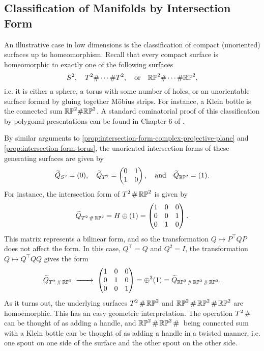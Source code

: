 \subsection{Classification of Manifolds by Intersection Form}
An illustrative case in low dimensions is the classification of compact (unoriented) surfaces up to homeomorphism. Recall that every compact surface is homeomorphic to exactly one of the following surfaces
\[
	S^2,\quad T^2\#\cdots\# T^2,\quad\textrm{or}\quad \mathbb{RP}^2\#\cdots\# \mathbb{RP}^2,
\]
i.e. it is either a sphere, a torus with some number of holes, or an unorientable surface formed by gluing together M\"obius strips. For instance, a Klein bottle is the connected sum $\mathbb{RP}^2\#\mathbb{RP}^2$. 
A standard cominatorial proof of this classification by polygonal presentations can be found in Chapter 6 of \cite{lee2011topological}.

By similar arguments to \cref{prop:intersection-form-complex-projective-plane} and \cref{prop:intersection-form-torus}, the unoriented intersection forms of these generating surfaces are given by
\[
	\widetilde{Q}_{S^2}=(0),\quad \widetilde{Q}_{T^2}=\begin{pmatrix}0 & 1 \\ 1 & 0\end{pmatrix},\quad \textrm{and}\quad\widetilde{Q}_{\mathbb{RP}^2} = (1).
\]
For instance, the intersection form of $T^2\,\#\, \mathbb{RP}^2$ is given by
\[
	\widetilde{Q}_{T^2\,\#\, \mathbb{RP}^2} = H\oplus (1)=
	\begin{pmatrix}
		1 & 0 & 0\\
		0 & 0 & 1\\
		0 & 1 & 0
	\end{pmatrix}.
\]
This matrix represents a bilinear form, and so the transformation $Q\mapsto P^\intercal Q P$ does not affect the form. In this case, $Q^\intercal =Q$ and $Q^2=I$, the transformation $Q\mapsto Q^\intercal Q Q$ gives the form
\[
	\widetilde{Q}_{T^2\+ \RP^2}
	\lkxto \begin{pmatrix}
		1 & 0 & 0\\
		0 & 1 & 0\\
		0 & 0 & 1
	\end{pmatrix} =\oplus^3(1)= \widetilde{Q}_{\RP^2\+\RP^2\+\RP^2}.
\]
As it turns out, the underlying surfaces $T^2\,\#\,\mathbb{RP}^2$ and $\mathbb{RP}^2\,\#\,\mathbb{RP}^2\,\#\,\mathbb{RP}^2$ are homoemorphic. This has an easy geometric interpretation. The operation $T^2\,\#\,$ can be thought of as adding a handle, and $\mathbb{RP}^2\,\#\,\mathbb{RP}^2\,\#\,$ being connected sum with a Klein bottle can be thought of as adding a handle in a twisted manner, i.e. one spout on one side of the surface and the other spout on the other side.

